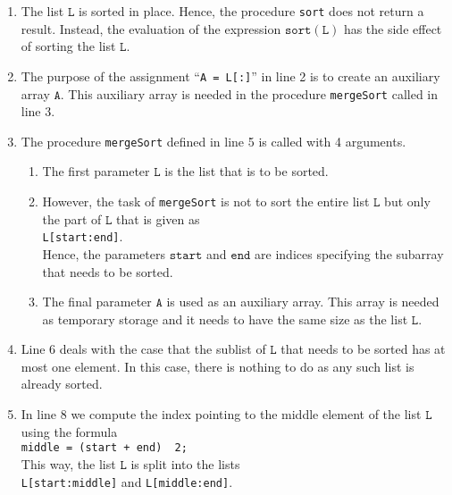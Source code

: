 \begin{enumerate}
\item The list $\mathtt{L}$ is sorted in place. Hence, the procedure 
      \texttt{sort} does not return a result.  Instead, the evaluation of the expression
      $\mathtt{sort}(\mathtt{L})$ has the side effect of sorting the list $\mathtt{L}$.
\item The purpose of the assignment ``\texttt{A = L[:]}'' in line 2 is to create an auxiliary array
      $\texttt{A}$.  This auxiliary array is needed in the procedure
      \texttt{mergeSort} called in line 3.
\item The procedure \texttt{mergeSort} defined in line 5 is called with 4 arguments.
      \begin{enumerate}
      \item The first parameter $\texttt{L}$ is the list that is to be sorted.
      \item However, the task of \texttt{mergeSort} is not to sort the entire list $\texttt{L}$ but only
            the part of $\texttt{L}$ that is given as
            \\[0.2cm]
            \hspace*{1.3cm} 
            \texttt{L[start:end]}. 
            \\[0.2cm]
            Hence, the parameters $\texttt{start}$ and $\texttt{end}$ are indices specifying the 
            subarray that needs to be sorted.
      \item The final parameter $\texttt{A}$ is used as an auxiliary array.  This array is needed
            as temporary storage and it needs to have the same size as the list $\texttt{L}$.
      \end{enumerate} 
\item Line 6 deals with the case that the sublist of $\texttt{L}$ that needs to be sorted has at most one element.  
      In this case, there is nothing to do as any such list is already sorted.
\item In line 8 we compute the index pointing to the middle element of the list $\texttt{L}$ using the
      formula \\[0.2cm]
      \hspace*{1.3cm} 
      \texttt{middle = (start + end) \dv\  2;} 
      \\[0.2cm]
      This way, the list $\texttt{L}$ is split into the lists 
      \\[0.2cm]
      \hspace*{1.3cm}
      \texttt{L[start:middle]} \quad and \quad \texttt{L[middle:end]}.

\end{enumerate}
